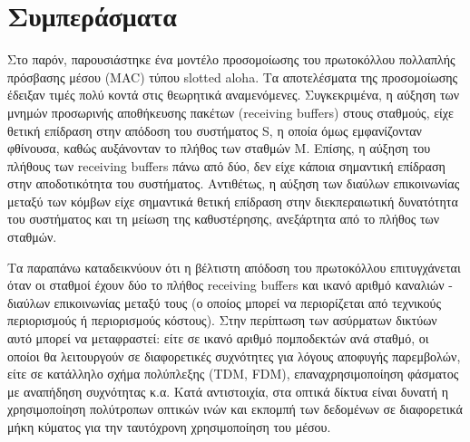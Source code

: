 \documentclass[12pt]{report}
\begin{document}
\section{Συμπεράσματα}
Στο παρόν, παρουσιάστηκε ένα μοντέλο προσομοίωσης του πρωτοκόλλου πολλαπλής πρόσβασης μέσου (\textlatin{MAC}) τύπου \textlatin{slotted aloha}. Τα αποτελέσματα της προσομοίωσης έδειξαν τιμές πολύ κοντά στις θεωρητικά αναμενόμενες. Συγκεκριμένα, η αύξηση των μνημών προσωρινής αποθήκευσης πακέτων (\textlatin{receiving buffers}) στους σταθμούς, είχε θετική επίδραση στην απόδοση του συστήματος \textlatin{S}, η οποία όμως εμφανίζονταν φθίνουσα, καθώς αυξάνονταν το πλήθος των σταθμών \textlatin{M}. Επίσης, η αύξηση του πλήθους των \textlatin{receiving buffers} πάνω από δύο, δεν είχε κάποια σημαντική επίδραση στην αποδοτικότητα του συστήματος. Αντιθέτως, η αύξηση των διαύλων επικοινωνίας μεταξύ των κόμβων είχε σημαντικά θετική επίδραση στην διεκπεραιωτική δυνατότητα του συστήματος και τη μείωση της καθυστέρησης, ανεξάρτητα από το πλήθος των σταθμών.

Τα παραπάνω καταδεικνύουν ότι η βέλτιστη απόδοση του πρωτοκόλλου επιτυγχάνεται όταν οι σταθμοί έχουν δύο το πλήθος \textlatin{receiving buffers} και ικανό αριθμό καναλιών - διαύλων επικοινωνίας μεταξύ τους (ο οποίος μπορεί να περιορίζεται από τεχνικούς περιορισμούς ή περιορισμούς κόστους). Στην περίπτωση των ασύρματων δικτύων αυτό μπορεί να μεταφραστεί: είτε σε ικανό αριθμό πομποδεκτών ανά σταθμό, οι οποίοι θα λειτουργούν σε διαφορετικές συχνότητες για λόγους αποφυγής παρεμβολών, είτε σε κατάλληλο σχήμα πολύπλεξης (\textlatin{TDM, FDM}), επαναχρησιμοποίηση φάσματος με αναπήδηση συχνότητας κ.α. Κατά αντιστοιχία, στα οπτικά δίκτυα είναι δυνατή η χρησιμοποίηση πολύτροπων οπτικών ινών και εκπομπή των δεδομένων σε διαφορετικά μήκη κύματος για την ταυτόχρονη χρησιμοποίηση του μέσου.

\begin{appendices}

\end{appendices}

\appendix



\end{document}
